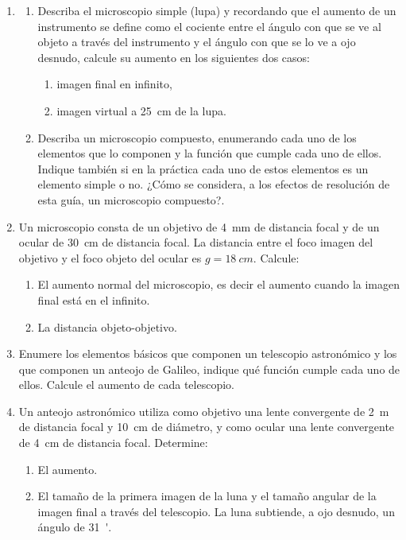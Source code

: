 \documentclass[11pt,spanish,a4paper]{article}
\begin{document}
\begin{enumerate}
\item
\begin{enumerate}
	\item Describa el microscopio simple (lupa) y recordando que el aumento de un instrumento se define como el cociente entre el ángulo con que se ve al objeto a través del instrumento y el ángulo con que se lo ve a ojo desnudo, calcule su aumento en los siguientes dos casos:
	\begin{enumerate}
		\item imagen final en infinito, 
		\item imagen virtual a \SI{25}{cm} de la lupa.
	\end{enumerate}
	\item Describa un microscopio compuesto, enumerando cada uno de los elementos que lo componen y la función que cumple cada uno de ellos.
	Indique también si en la práctica cada uno de estos elementos es un elemento simple o no.
	¿Cómo se considera, a los efectos de resolución de esta guía, un microscopio compuesto?.
\end{enumerate}


\item Un microscopio consta de un objetivo de \SI{4}{mm} de distancia focal y de un ocular de \SI{30}{cm} de distancia focal.
	La distancia entre el foco imagen del objetivo y el foco objeto del ocular es \(g= \SI{18}{cm}\). Calcule:
\begin{enumerate}
	\item El aumento normal del microscopio, es decir el aumento cuando la imagen final está en el infinito.
	\item La distancia objeto-objetivo.
\end{enumerate}


\item Enumere los elementos básicos que componen un telescopio astronómico y los que componen un anteojo de Galileo, indique qué función cumple cada uno de ellos.
	Calcule el aumento de cada telescopio.


\item Un anteojo astronómico utiliza como objetivo una lente convergente de \SI{2}{m} de distancia focal y \SI{10}{cm} de diámetro, y como ocular una lente convergente de \SI{4}{cm} de distancia focal.
	Determine:
	\begin{enumerate}
		\item El aumento.
		\item El tamaño de la primera imagen de la luna y el tamaño angular de la imagen final a
través del telescopio.
La luna subtiende, a ojo desnudo, un ángulo de \SI{31}{'}.
	\end{enumerate}

	
\end{enumerate}
\end{document}
